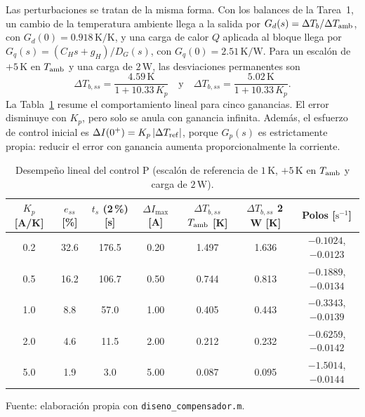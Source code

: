 Las perturbaciones se tratan de la misma forma. Con los balances de la Tarea~1, un cambio de la temperatura ambiente llega a la salida por $G_d(s)=\Delta T_b/\Delta T_{\rm amb}$, con $G_d(0)=0.918\,\mathrm{K/K}$, y una carga de calor $Q$ aplicada al bloque llega por $G_q(s)=(C_Hs+g_H)/D_G(s)$, con $G_q(0)=2.51\,\mathrm{K/W}$. Para un escalón de $+5\,\mathrm K$ en $T_{\rm amb}$ y una carga de $2\,\mathrm W$, las desviaciones permanentes son
\begin{equation}
\Delta T_{b,ss}=\frac{4.59\,\mathrm K}{1+10.33\,K_p}\quad\text{y}\quad\Delta T_{b,ss}=\frac{5.02\,\mathrm K}{1+10.33\,K_p}.\label{eq:essD}
\end{equation}
La Tabla~\ref{tab:P_analitico} resume el comportamiento lineal para cinco ganancias. El error disminuye con $K_p$, pero solo se anula con ganancia infinita. Además, el esfuerzo de control inicial es $\Delta I(0^+)=K_p\,|\Delta T_{\rm ref}|$, porque $G_p(s)$ es estrictamente propia: reducir el error con ganancia aumenta proporcionalmente la corriente.

\begin{table}[!tbp]\centering
\caption{Desempeño lineal del control P (escalón de referencia de $1\,\mathrm K$, $+5\,\mathrm K$ en $T_{\rm amb}$ y carga de $2\,\mathrm W$).}\label{tab:P_analitico}
{\tableformat\setlength{\tabcolsep}{2.2pt}
\begin{tabular}{@{}ccccccc@{}}\toprule
\shortstack{$K_p$\\{[A/K]}} & \shortstack{$e_{ss}$\\{[\%]}} & \shortstack{$t_s$ (2\,\%)\\{[s]}} & \shortstack{$\Delta I_{\max}$\\{[A]}} & \shortstack{$\Delta T_{b,ss}$\\$T_{\rm amb}$ [K]} & \shortstack{$\Delta T_{b,ss}$\\2\,W [K]} & \shortstack{Polos\\{[$\mathrm{s^{-1}}$]}}\\\midrule
0.2 & 32.6 & 176.5 & 0.20 & 1.497 & 1.636 & $-0.1024$, $-0.0123$\\
0.5 & 16.2 & 106.7 & 0.50 & 0.744 & 0.813 & $-0.1889$, $-0.0134$\\
1.0 & 8.8 & 57.0 & 1.00 & 0.405 & 0.443 & $-0.3343$, $-0.0139$\\
2.0 & 4.6 & 11.5 & 2.00 & 0.212 & 0.232 & $-0.6259$, $-0.0142$\\
5.0 & 1.9 & 3.0 & 5.00 & 0.087 & 0.095 & $-1.5014$, $-0.0144$\\\bottomrule
\end{tabular}}
\par\smallskip\footnotesize Fuente: elaboración propia con \texttt{diseno\_compensador.m}.
\end{table}

